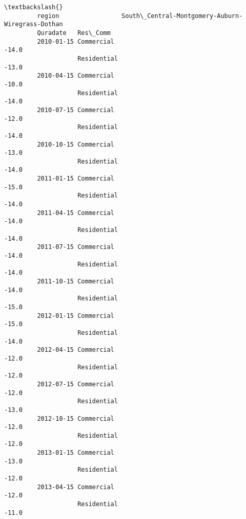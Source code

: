 \documentclass[11pt]{article}
\begin{document}
\begin{Verbatim}[commandchars=\\\{\}]
                                                                                  \textbackslash{}
         region                 South\_Central-Montgomery-Auburn-Wiregrass-Dothan   
         Quradate   Res\_Comm                                                       
         2010-01-15 Commercial                                             -14.0   
                    Residential                                            -13.0   
         2010-04-15 Commercial                                             -10.0   
                    Residential                                            -14.0   
         2010-07-15 Commercial                                             -12.0   
                    Residential                                            -14.0   
         2010-10-15 Commercial                                             -13.0   
                    Residential                                            -14.0   
         2011-01-15 Commercial                                             -15.0   
                    Residential                                            -14.0   
         2011-04-15 Commercial                                             -14.0   
                    Residential                                            -14.0   
         2011-07-15 Commercial                                             -14.0   
                    Residential                                            -14.0   
         2011-10-15 Commercial                                             -14.0   
                    Residential                                            -15.0   
         2012-01-15 Commercial                                             -15.0   
                    Residential                                            -14.0   
         2012-04-15 Commercial                                             -12.0   
                    Residential                                            -12.0   
         2012-07-15 Commercial                                             -12.0   
                    Residential                                            -13.0   
         2012-10-15 Commercial                                             -12.0   
                    Residential                                            -12.0   
         2013-01-15 Commercial                                             -13.0   
                    Residential                                            -12.0   
         2013-04-15 Commercial                                             -12.0   
                    Residential                                            -11.0   

\end{Verbatim}
\end{document}
